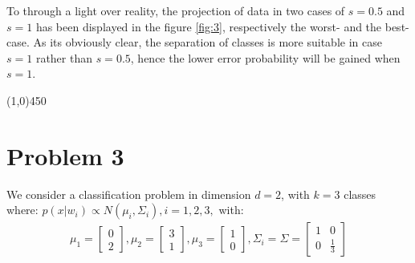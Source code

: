 \documentclass[12pt]{article}
\begin{document}
\begin{enumerate}
To through a light over reality, the projection of data in two cases of $s = 0.5$ and $s = 1$ has been displayed in the figure \ref{fig:3}, respectively the worst- and the best-case. As its obviously clear, the separation of classes is more suitable in case $s = 1$ rather than $s = 0.5$, hence the lower error probability will be gained when $s = 1$.



\end{enumerate}

\begin{center}
\line(1,0){450}
\end{center}

\section{Problem 3}
We consider a classification problem in dimension $d=2$, with $k=3$ classes where:
$p ( x | w_i ) \propto N ( \mu_i , \Sigma_i ), i = 1 , 2 , 3 , $ with:
\begin{align*}
\mu_1 = \left[ \begin{matrix}
0 \\ 2
\end{matrix} \right] ,
\mu_2 = \left[ \begin{matrix}
3 \\ 1
\end{matrix} \right] ,
\mu_3 = \left[ \begin{matrix}
1 \\ 0
\end{matrix} \right] ,
\Sigma_i = \Sigma = \left[ \begin{matrix}
1 & 0 \\
0 & \frac{1}{3}
\end{matrix} \right]
\end{align*}
\end{document}
